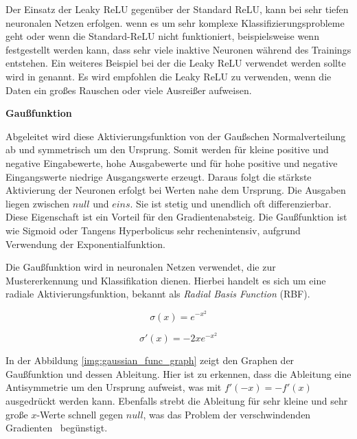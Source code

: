 Der Einsatz der Leaky ReLU gegenüber der Standard ReLU, kann bei sehr tiefen neuronalen Netzen erfolgen. wenn es um sehr komplexe Klassifizierungsprobleme geht oder wenn die Standard-ReLU nicht funktioniert, beispielsweise wenn festgestellt werden kann, dass sehr viele inaktive Neuronen während des Trainings entstehen. Ein weiteres Beispiel bei der die Leaky ReLU verwendet werden sollte wird in \cite{rallabandi-2023} genannt. Es wird empfohlen die Leaky ReLU zu verwenden, wenn die Daten ein großes Rauschen oder viele Ausreißer aufweisen.\vspace{0.2cm}

%
\textbf{Gaußfunktion}\vspace{0.2cm}

Abgeleitet wird diese Aktivierungsfunktion von der Gaußschen Normalverteilung ab und symmetrisch um den Ursprung. Somit werden für kleine positive und negative Eingabewerte, hohe Ausgabewerte und für hohe positive und negative Eingangswerte niedrige Ausgangswerte erzeugt. Daraus folgt die stärkste Aktivierung der Neuronen erfolgt bei Werten nahe dem Ursprung. Die Ausgaben liegen zwischen $null$ und $eins$. Sie ist stetig und unendlich oft differenzierbar. Diese Eigenschaft ist ein Vorteil für den Gradientenabsteig. Die Gaußfunktion ist wie Sigmoid oder Tangens Hyperbolicus sehr rechenintensiv, aufgrund Verwendung der Exponentialfunktion.\vspace{0.2cm}

Die Gaußfunktion wird in neuronalen Netzen verwendet, die zur Mustererkennung und Klassifikation dienen. Hierbei handelt es sich um eine radiale Aktivierungsfunktion, bekannt als \textit{Radial Basis Function} (\acrshort{RBF}).

\begin{equation}\label{eq:gaussian_function}
	\sigma (x) = e^{-x^{2}}
\end{equation}

\begin{equation}\label{eq:derivative_gaussian_function}
	\sigma' (x) = -2x e^{-x^{2}}
\end{equation}

In der Abbildung \ref{img:gaussian_func_graph} zeigt den Graphen der Gaußfunktion und dessen Ableitung. Hier ist zu erkennen, dass die Ableitung eine Antisymmetrie um den Ursprung aufweist, was mit $f'(-x) = -f'(x)$ ausgedrückt werden kann. Ebenfalls strebt die Ableitung für sehr kleine und sehr große $x$-Werte schnell gegen $null$, was das \glqq Problem der verschwindenden Gradienten \grqq \ begünstigt.

